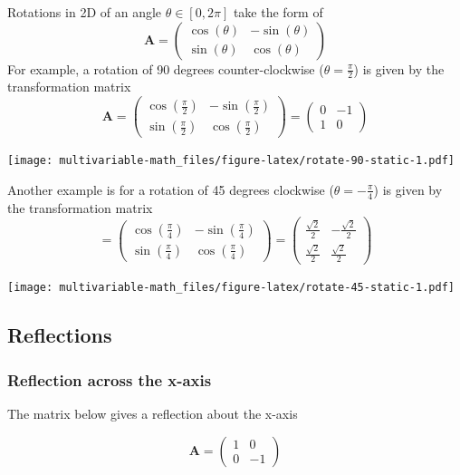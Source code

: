 \documentclass[
]{book}
\theoremstyle{definition}
\theoremstyle{definition}
\theoremstyle{definition}
\theoremstyle{remark}
\begin{document}
Rotations in 2D of an angle \(\theta \in [0, 2\pi]\) take the form of
\[
\mathbf{A} = \begin{pmatrix}
\cos(\theta) & -\sin(\theta) \\
\sin(\theta) & \cos(\theta)
\end{pmatrix}
\]
For example, a rotation of 90 degrees counter-clockwise (\(\theta = \frac{\pi}{2}\)) is given by the transformation matrix
\[
\mathbf{A} = \begin{pmatrix}
\cos(\frac{\pi}{2}) & -\sin(\frac{\pi}{2}) \\
\sin(\frac{\pi}{2}) & \cos(\frac{\pi}{2})
\end{pmatrix} = 
\begin{pmatrix}
0 & -1 \\
1 & 0
\end{pmatrix}
\]

\texttt{[image: multivariable-math\_files/figure-latex/rotate-90-static-1.pdf]}

Another example is for a rotation of 45 degrees clockwise (\(\theta = -\frac{\pi}{4}\)) is given by the transformation matrix
\[
 = \begin{pmatrix}
\cos(\frac{\pi}{4}) & -\sin(\frac{\pi}{4}) \\
\sin(\frac{\pi}{4}) & \cos(\frac{\pi}{4})
\end{pmatrix} = 
\begin{pmatrix}
\frac{\sqrt{2}}{2} & -\frac{\sqrt{2}}{2} \\
\frac{\sqrt{2}}{2} & \frac{\sqrt{2}}{2}
\end{pmatrix}
\]

\texttt{[image: multivariable-math\_files/figure-latex/rotate-45-static-1.pdf]}

\hypertarget{reflections}{%
\subsection{Reflections}\label{reflections}}

\hypertarget{reflection-across-the-x-axis}{%
\subsubsection{Reflection across the x-axis}\label{reflection-across-the-x-axis}}

The matrix below gives a reflection about the x-axis

\[
\mathbf{A} = \begin{pmatrix}
1 & 0 \\
0 & -1
\end{pmatrix}
\]
\end{document}
